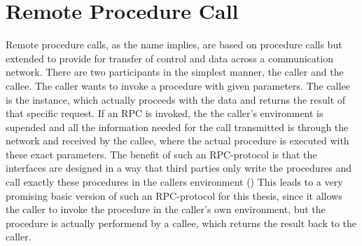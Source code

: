 \section{Remote Procedure Call}
Remote procedure calls, as the name implies, are based on procedure calls but extended
to provide for transfer of control and data across a communication network. There are
two participants in the simplest manner, the caller and the callee. The caller wants to invoke a
procedure with given parameters. The callee is the instance, which actually proceeds with
the data and returns the result of that specific request. If an RPC is invoked, the the caller’s
environment is supended and all the information needed for the call transmitted is through the
network and received by the callee, where the actual procedure is executed with these exact
parameters. The benefit of such an RPC-protocol is that the interfaces are designed in a
way that third parties only write the procedures and call exactly these procedures in the
callers environment (\citet{birrell1984implementing}) This leads to a very promising basic version of such
an RPC-protocol for this thesis, since it allows the caller to invoke the procedure in the caller's own  environment, but the procedure is actually performend by a callee, which returns the result back to the caller.\citet{birrell1984implementing}
